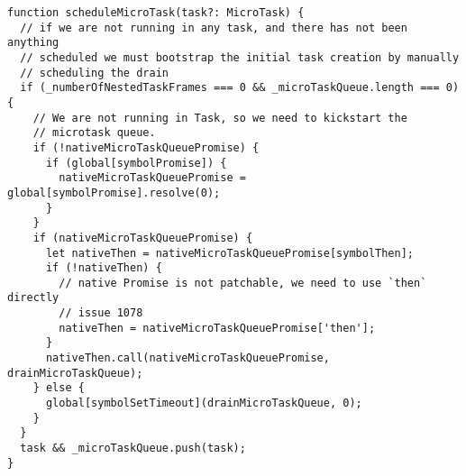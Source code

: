 \begin{verbatim}
function scheduleMicroTask(task?: MicroTask) {
  // if we are not running in any task, and there has not been anything
  // scheduled we must bootstrap the initial task creation by manually
  // scheduling the drain
  if (_numberOfNestedTaskFrames === 0 && _microTaskQueue.length === 0) {
    // We are not running in Task, so we need to kickstart the
    // microtask queue.
    if (!nativeMicroTaskQueuePromise) {
      if (global[symbolPromise]) {
        nativeMicroTaskQueuePromise = global[symbolPromise].resolve(0);
      }
    }
    if (nativeMicroTaskQueuePromise) {
      let nativeThen = nativeMicroTaskQueuePromise[symbolThen];
      if (!nativeThen) {
        // native Promise is not patchable, we need to use `then` directly
        // issue 1078
        nativeThen = nativeMicroTaskQueuePromise['then'];
      }
      nativeThen.call(nativeMicroTaskQueuePromise, drainMicroTaskQueue);
    } else {
      global[symbolSetTimeout](drainMicroTaskQueue, 0);
    }
  }
  task && _microTaskQueue.push(task);
}
\end{verbatim}
